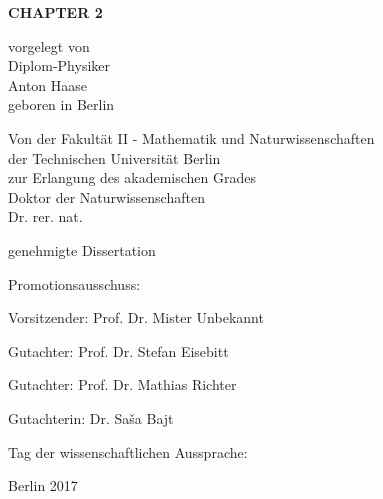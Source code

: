 
\begin{titlepage}
{\noindent\sffamily\large%
    \begin{center}
        \vspace*{3ex}
        {\LARGE\bfseries\sffamily
            CHAPTER 2
        }
        \vspace{1cm}

        vorgelegt von \\
        Diplom-Physiker \\
        Anton Haase \\
        geboren in Berlin \\
        \vspace{4cm}

        Von der Fakultät II - Mathematik und Naturwissenschaften \\
        der Technischen Universität Berlin \\
        zur Erlangung des akademischen Grades \\
        Doktor der Naturwissenschaften \\
        Dr. rer. nat. \\
        \vspace{3ex}

        genehmigte Dissertation \\
        \vspace{2cm}
    \end{center}

    Promotionsausschuss:
    \vspace{2ex}

    Vorsitzender: Prof. Dr. Mister Unbekannt

    Gutachter: Prof. Dr. Stefan Eisebitt

    Gutachter: Prof. Dr. Mathias Richter

    Gutachterin: Dr. Sa\v{s}a Bajt
    \vspace{1ex}

    Tag der wissenschaftlichen Aussprache:

    \vfill
    \begin{center}
        Berlin 2017
    \end{center}
}
\end{titlepage}

\cleardoublepage

